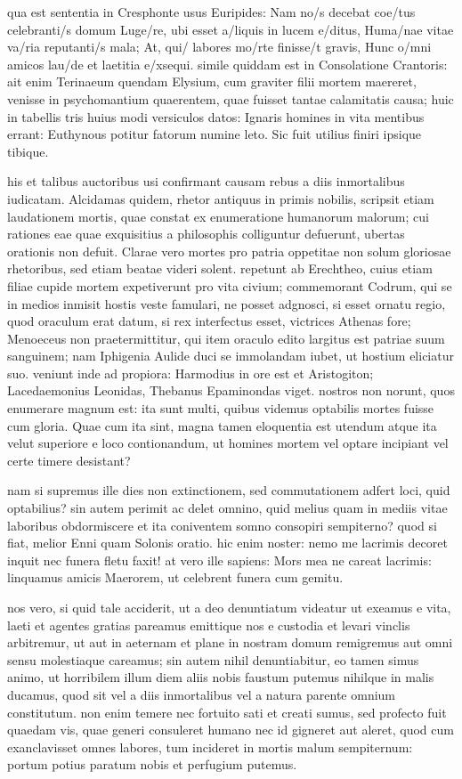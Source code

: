  qua est sententia in Cresphonte usus Euripides: Nam no/s decebat coe/tus celebranti/s domum Luge/re, ubi esset a/liquis in lucem e/ditus, Huma/nae vitae va/ria reputanti/s mala; At, qui/ labores mo/rte finisse/t gravis, Hunc o/mni amicos lau/de et laetitia e/xsequi. simile quiddam est in Consolatione Crantoris: ait enim Terinaeum quendam Elysium, cum graviter filii mortem maereret, venisse in psychomantium quaerentem, quae fuisset tantae calamitatis causa; huic in tabellis tris huius modi versiculos datos: Ignaris homines in vita mentibus errant: Euthynous potitur fatorum numine leto. Sic fuit utilius finiri ipsique tibique.

 his et talibus auctoribus usi confirmant causam rebus a diis inmortalibus iudicatam. Alcidamas quidem, rhetor antiquus in primis nobilis, scripsit etiam laudationem mortis, quae constat ex enumeratione humanorum malorum; cui rationes eae quae exquisitius a philosophis colliguntur defuerunt, ubertas orationis non defuit. Clarae vero mortes pro patria oppetitae non solum gloriosae rhetoribus, sed etiam beatae videri solent. repetunt ab Erechtheo, cuius etiam filiae cupide mortem expetiverunt pro vita civium; commemorant Codrum, qui se in medios inmisit hostis veste famulari, ne posset adgnosci, si esset ornatu regio, quod oraculum erat datum, si rex interfectus esset, victrices Athenas fore; Menoeceus non praetermittitur, qui item oraculo edito largitus est patriae suum sanguinem; nam Iphigenia Aulide duci se immolandam iubet, ut hostium eliciatur suo. veniunt inde ad propiora: Harmodius in ore est et Aristogiton; Lacedaemonius Leonidas, Thebanus Epaminondas viget. nostros non norunt, quos enumerare magnum est: ita sunt multi, quibus videmus optabilis mortes fuisse cum gloria. Quae cum ita sint, magna tamen eloquentia est utendum atque ita velut superiore e loco contionandum, ut homines mortem vel optare incipiant vel certe timere desistant?

 nam si supremus ille dies non extinctionem, sed commutationem adfert loci, quid optabilius? sin autem perimit ac delet omnino, quid melius quam in mediis vitae laboribus obdormiscere et ita coniventem somno consopiri sempiterno? quod si fiat, melior Enni quam Solonis oratio. hic enim noster: nemo me lacrimis decoret inquit nec funera fletu faxit! at vero ille sapiens: Mors mea ne careat lacrimis: linquamus amicis Maerorem, ut celebrent funera cum gemitu.

 nos vero, si quid tale acciderit, ut a deo denuntiatum videatur ut exeamus e vita, laeti et agentes gratias pareamus emittique nos e custodia et levari vinclis arbitremur, ut aut in aeternam et plane in nostram domum remigremus aut omni sensu molestiaque careamus; sin autem nihil denuntiabitur, eo tamen simus animo, ut horribilem illum diem aliis nobis faustum putemus nihilque in malis ducamus, quod sit vel a diis inmortalibus vel a natura parente omnium constitutum. non enim temere nec fortuito sati et creati sumus, sed profecto fuit quaedam vis, quae generi consuleret humano nec id gigneret aut aleret, quod cum exanclavisset omnes labores, tum incideret in mortis malum sempiternum: portum potius paratum nobis et perfugium putemus.

